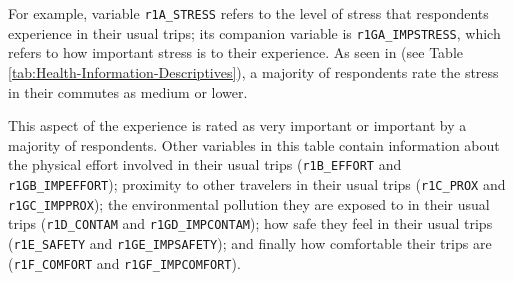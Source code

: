 \documentclass[
11pt, %
oneside, %
english, %
singlespacing, %
]{macthesis} %
\begin{document}
For example, variable \texttt{r1A\_STRESS} refers to the level of stress that respondents experience in their usual trips; its companion variable is \texttt{r1GA\_IMPSTRESS}, which refers to how important stress is to their experience. As seen in (see Table \ref{tab:Health-Information-Descriptives}), a majority of respondents rate the stress in their commutes as medium or lower.

This aspect of the experience is rated as very important or important by a majority of respondents. Other variables in this table contain information about the physical effort involved in their usual trips (\texttt{r1B\_EFFORT} and \texttt{r1GB\_IMPEFFORT}); proximity to other travelers in their usual trips (\texttt{r1C\_PROX} and \texttt{r1GC\_IMPPROX}); the environmental pollution they are exposed to in their usual trips (\texttt{r1D\_CONTAM} and \texttt{r1GD\_IMPCONTAM}); how safe they feel in their usual trips (\texttt{r1E\_SAFETY} and \texttt{r1GE\_IMPSAFETY}); and finally how comfortable their trips are (\texttt{r1F\_COMFORT} and \texttt{r1GF\_IMPCOMFORT}).
\end{document}
